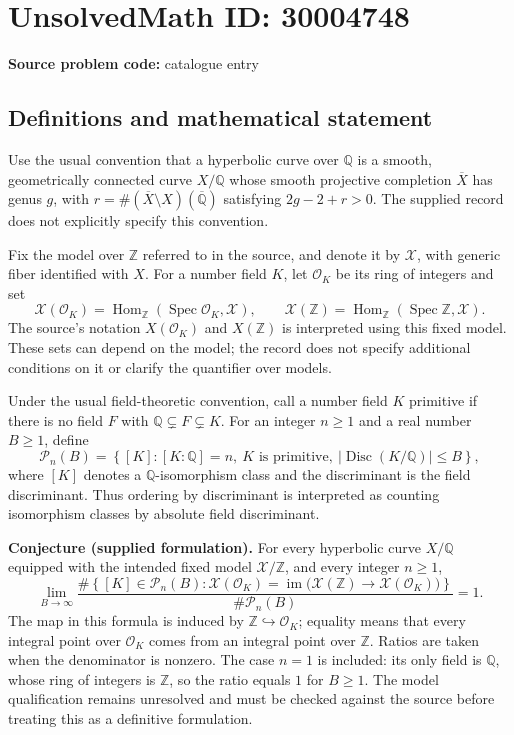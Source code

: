 \documentclass[11pt]{article}
\newcommand{\Z}{\mathbb{Z}}
\newcommand{\Q}{\mathbb{Q}}
\begin{document}
\section*{UnsolvedMath ID: 30004748}
\textbf{Source problem code:} catalogue entry
\subsection{Definitions and mathematical statement}
Use the usual convention that a hyperbolic curve over \(\Q\) is a smooth, geometrically connected curve \(X/\Q\) whose smooth projective completion \(\overline X\) has genus \(g\), with \(r=\#(\overline X\setminus X)(\overline{\Q})\) satisfying \(2g-2+r>0\). The supplied record does not explicitly specify this convention.

Fix the model over \(\Z\) referred to in the source, and denote it by \(\mathcal X\), with generic fiber identified with \(X\). For a number field \(K\), let \(\mathcal O_K\) be its ring of integers and set
\[
\mathcal X(\mathcal O_K)=\operatorname{Hom}_{\Z}(\operatorname{Spec}\mathcal O_K,\mathcal X),\qquad
\mathcal X(\Z)=\operatorname{Hom}_{\Z}(\operatorname{Spec}\Z,\mathcal X).
\]
The source's notation \(X(\mathcal O_K)\) and \(X(\Z)\) is interpreted using this fixed model. These sets can depend on the model; the record does not specify additional conditions on it or clarify the quantifier over models.

Under the usual field-theoretic convention, call a number field \(K\) primitive if there is no field \(F\) with \(\Q\subsetneq F\subsetneq K\). For an integer \(n\geq1\) and a real number \(B\geq1\), define
\[
\mathcal P_n(B)=\left\{[K]:[K:\Q]=n,\ K\text{ is primitive},\ |\operatorname{Disc}(K/\Q)|\leq B\right\},
\]
where \([K]\) denotes a \(\Q\)-isomorphism class and the discriminant is the field discriminant. Thus ordering by discriminant is interpreted as counting isomorphism classes by absolute field discriminant.

\textbf{Conjecture (supplied formulation).} For every hyperbolic curve \(X/\Q\) equipped with the intended fixed model \(\mathcal X/\Z\), and every integer \(n\geq1\),
\[
\lim_{B\to\infty}
\frac{\#\left\{[K]\in\mathcal P_n(B):
\mathcal X(\mathcal O_K)=
\operatorname{im}\bigl(\mathcal X(\Z)\longrightarrow\mathcal X(\mathcal O_K)\bigr)
\right\}}
{\#\mathcal P_n(B)}=1.
\]
The map in this formula is induced by \(\Z\hookrightarrow\mathcal O_K\); equality means that every integral point over \(\mathcal O_K\) comes from an integral point over \(\Z\). Ratios are taken when the denominator is nonzero. The case \(n=1\) is included: its only field is \(\Q\), whose ring of integers is \(\Z\), so the ratio equals \(1\) for \(B\geq1\). The model qualification remains unresolved and must be checked against the source before treating this as a definitive formulation.
\end{document}
